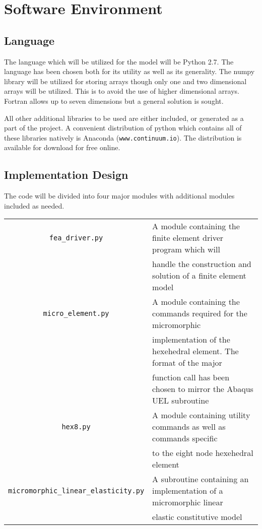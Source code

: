 \section{Software Environment}

\subsection{Language}

The language which will be utilized for the model will be Python 2.7. The language has been chosen both for its utility as well as its generality. The numpy library will be utilized for storing arrays though only one and two dimensional arrays will be utilized. This is to avoid the use of higher dimensional arrays. Fortran allows up to seven dimensions but a general solution is sought.

All other additional libraries to be used are either included, or generated as a part of the project. A convenient distribution of python which contains all of these libraries natively is Anaconda (\verb|www.continuum.io|). The distribution is available for download for free online.

\subsection{Implementation Design}

The code will be divided into four major modules with additional modules included as needed.

\begin{table}[htb!]
\centering
\begin{tabular}{|c|l|}
\hline
\verb|fea_driver.py| & A module containing the finite element driver program which will\\
& handle the construction and solution of a finite element model\\
\hline
\verb|micro_element.py| & A module containing the commands required for the micromorphic\\
& implementation of the hexehedral element. The format of the major\\
& function call has been chosen to mirror the Abaqus UEL subroutine\\
\hline
\verb|hex8.py| & A module containing utility commands as well as commands specific\\
& to the eight node hexehedral element\\
\hline
\verb|micromorphic_linear_elasticity.py| & A subroutine containing an implementation of a micromorphic linear\\
& elastic constitutive model\\
\hline
\end{tabular}
\end{table}

